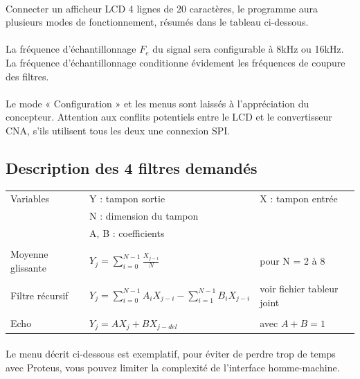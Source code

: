 \documentclass{article}
\begin{document}
    \paragraph{}
    Connecter un afficheur LCD 4 lignes de 20 caractères, le programme aura plusieurs modes de fonctionnement, résumés dans le tableau ci-dessous.

    \paragraph{}
    La fréquence d’échantillonnage $F_e$ du signal sera configurable à 8kHz ou 16kHz. La fréquence d’échantillonnage conditionne évidement les fréquences de coupure des filtres.

    \paragraph{}
    Le mode « Configuration » et les menus sont laissés à l’appréciation du concepteur. Attention aux conflits potentiels entre le LCD et le convertisseur CNA, s'ils utilisent tous les deux une connexion SPI.

    \subsection{Description des 4 filtres demandés}

    \begin{tabular}{l l l}
        Variables           & Y : tampon sortie & X : tampon entrée \\
                            & N : dimension du tampon & \\
                            & A, B : coefficients & \\
                            & & \\
        Moyenne glissante   & $Y_j = \sum\limits_{i=0}^{N-1} \frac{X_{j-i}}{N}$ & pour N = 2 à 8 \\
                            & & \\
        Filtre récursif     & $Y_j = \sum\limits_{i=0}^{N-1} A_i X_{j-i} - \sum\limits_{i=1}^{N-1} B_i X_{j-i}$ & voir fichier tableur joint \\
                            & & \\
        Echo                &  $Y_j = A X_j + B X_{j-del}$ & avec $A + B = 1$ \\
    \end{tabular}

    \paragraph{}
    Le menu décrit ci-dessous est exemplatif, pour éviter de perdre trop de temps avec Proteus, vous pouvez limiter la complexité de l’interface homme-machine.
\end{document}
